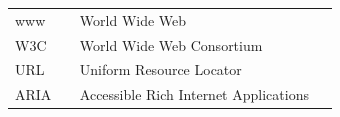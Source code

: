 \documentclass[a4paper,bibtotoc,oneside]{scrbook}
\begin{document}







\hspace{-17mm}\begin{tabular}{>{\raggedleft}p{0.2\linewidth} p{0.75\linewidth} p{0.1\linewidth}}
www & World Wide Web \\
W3C & World Wide Web Consortium\\
URL & Uniform Resource Locator\\
ARIA & Accessible Rich Internet Applications
\end{tabular}


\end{document}
